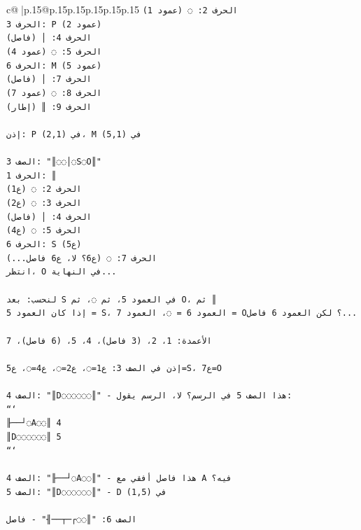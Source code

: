 \documentclass{article}
\begin{document}
{\begin{supertabular}{c@{$\;$}|p{.15\linewidth}@{}p{.15\linewidth}p{.15\linewidth}p{.15\linewidth}p{.15\linewidth}p{.15\linewidth}}
{{{\texttt{الحرف 2: ◌ (عمود 1)} \\
\texttt{الحرف 3: P (عمود 2)} \\
\texttt{الحرف 4: │ (فاصل)} \\
\texttt{الحرف 5: ◌ (عمود 4)} \\
\texttt{الحرف 6: M (عمود 5)} \\
\texttt{الحرف 7: │ (فاصل)} \\
\texttt{الحرف 8: ◌ (عمود 7)} \\
\texttt{الحرف 9: ║ (إطار)} \\
\\ 
\texttt{إذن: P في (2,1)، M في (5,1)} \\
\\ 
\texttt{الصف 3: "║◌◌│◌S◌O║"} \\
\texttt{الحرف 1: ║} \\
\texttt{الحرف 2: ◌ (ع1)} \\
\texttt{الحرف 3: ◌ (ع2)} \\
\texttt{الحرف 4: │ (فاصل)} \\
\texttt{الحرف 5: ◌ (ع4)} \\
\texttt{الحرف 6: S (ع5)} \\
\texttt{الحرف 7: ◌ (ع6؟ لا، ع6 فاصل...)} \\
\texttt{انتظر، O في النهاية...} \\
\\ 
\texttt{لنحسب: بعد S في العمود 5، ثم ◌، ثم O، ثم ║} \\
\texttt{إذا كان العمود 5 = S، العمود 6 = ◌، العمود 7 = O؟ لكن العمود 6 فاصل...} \\
\\ 
\texttt{الأعمدة: 1، 2، (3 فاصل)، 4، 5، (6 فاصل)، 7} \\
\\ 
\texttt{إذن في الصف 3: ع1=◌، ع2=◌، ع4=◌، ع5=S، ع7=O} \\
\\ 
\texttt{الصف 4: "║D◌◌◌◌◌◌║" {-} هذا الصف 5 في الرسم؟ لا، الرسم يقول:} \\
\texttt{```} \\
\texttt{╟──┘◌A◌◌║ 4} \\
\texttt{║D◌◌◌◌◌◌║ 5} \\
\texttt{```} \\
\\ 
\texttt{الصف 4: "╟──┘◌A◌◌║" {-} هذا فاصل أفقي مع A فيه؟} \\
\texttt{الصف 5: "║D◌◌◌◌◌◌║" {-} D في (1,5)} \\
\\ 
\texttt{الصف 6: "║◌◌┌─┬──╢" {-} فاصل} \\
}}}
\end{supertabular}}
\end{document}
